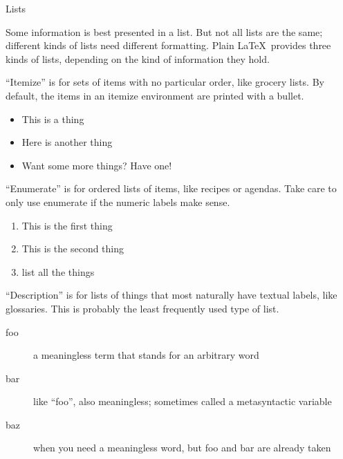 \documentclass{article}
\begin{document}
\begin{center}
\Large Lists
\end{center}

Some information is best presented in a list. But not all lists are the same; different kinds of lists need different formatting. Plain \LaTeX\ provides three kinds of lists, depending on the kind of information they hold.

``Itemize'' is for sets of items with no particular order, like grocery lists. By default, the items in an itemize environment are printed with a bullet.
\begin{itemize}
\item This is a thing
\item Here is another thing
\item Want some more things? Have one!
\end{itemize}

``Enumerate'' is for ordered lists of items, like recipes or agendas. Take care to only use enumerate if the numeric labels make sense.
\begin{enumerate}
\item This is the first thing
\item This is the second thing
\item list all the things
\end{enumerate}

``Description'' is for lists of things that most naturally have textual labels, like glossaries. This is probably the least frequently used type of list.
\begin{description}
\item[foo] a meaningless term that stands for an arbitrary word
\item[bar] like ``foo'', also meaningless; sometimes called a metasyntactic variable
\item[baz] when you need a meaningless word, but foo and bar are already taken
\end{description}
\end{document}
